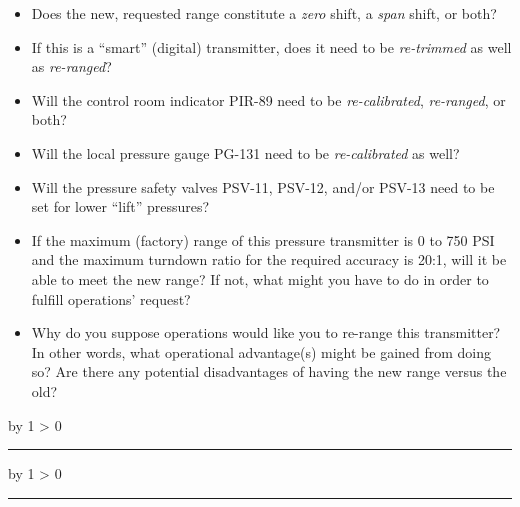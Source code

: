 \documentclass[12pt,a4paper]{article}
\def\svar{
           \advance\answnum by 1
           \ifnum \answnum > 0
                \hrule
                \vskip 3pt
                \leftline{Svar \the\answnum}
                \vskip 3pt \fi}
\def\notes{
           \advance\explnum by 1
           \ifnum \explnum > 0
                \hrule
                \vskip 3pt
                \leftline{Notes \the\explnum}
                \vskip 3pt \fi}
\begin{document}
\begin{itemize}
\item{} Does the new, requested range constitute a {\it zero} shift, a {\it span} shift, or both?
\vskip 10pt
\item{} If this is a ``smart'' (digital) transmitter, does it need to be {\it re-trimmed} as well as {\it re-ranged}?
\vskip 10pt
\item{} Will the control room indicator PIR-89 need to be {\it re-calibrated}, {\it re-ranged}, or both?
\vskip 10pt
\item{} Will the local pressure gauge PG-131 need to be {\it re-calibrated} as well?
\vskip 10pt
\item{} Will the pressure safety valves PSV-11, PSV-12, and/or PSV-13 need to be set for lower ``lift'' pressures?
\vskip 10pt
\item{} If the maximum (factory) range of this pressure transmitter is 0 to 750 PSI and the maximum turndown ratio for the required accuracy is 20:1, will it be able to meet the new range?  If not, what might you have to do in order to fulfill operations' request?
\vskip 10pt
\item{} Why do you suppose operations would like you to re-range this transmitter?  In other words, what operational advantage(s) might be gained from doing so?  Are there any potential disadvantages of having the new range versus the old?
\end{itemize}

\vskip 10pt \filbreak 





\svar{} 


\vskip 10pt \filbreak 





\notes{} 
\end{document}

